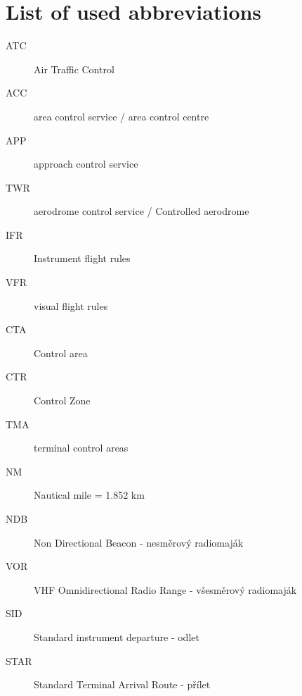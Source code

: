 \chapter{List of used abbreviations}

\begin{description}
\item[ATC] Air Traffic Control
\item[ACC] area control service / area control centre
\item[APP] approach control service
\item[TWR] aerodrome control service / Controlled aerodrome
\item[IFR] Instrument flight rules
\item[VFR] visual flight rules
\item[CTA] Control area
\item[CTR] Control Zone
\item[TMA] terminal control areas
\item[NM] Nautical mile = 1.852 km
\item[NDB] Non Directional Beacon - nesměrový radiomaják
\item[VOR] VHF Omnidirectional Radio Range - všesměrový radiomaják
\item[SID] Standard instrument departure - odlet
\item[STAR] Standard Terminal Arrival Route - přílet
\end{description}
